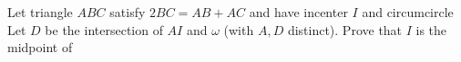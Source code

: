 Let triangle $ABC$ satisfy $2BC = AB+AC$ and have incenter $I$ and circumcircle  Let $D$ be the intersection of $AI$ and $\omega$ (with $A, D$ distinct). Prove that $I$ is the midpoint of 